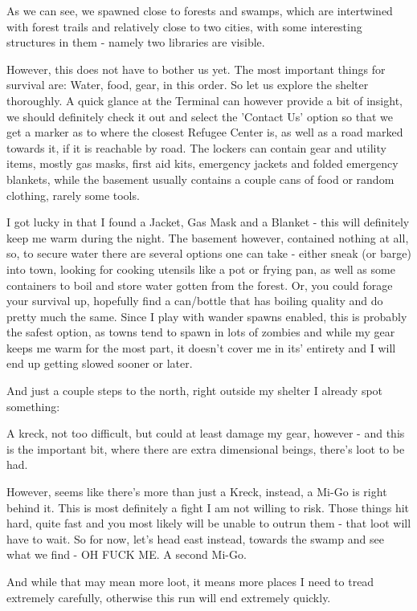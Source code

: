 \documentclass[11pt]{report}
\begin{document}
As we can see, we spawned close to forests and swamps, which are intertwined with forest trails and relatively close to two cities, with some interesting structures in them - namely two libraries are visible.

However, this does not have to bother us yet. The most important things for survival are:
Water,
food,
gear,
in this order. So let us explore the shelter thoroughly.
A quick glance at the Terminal can however provide a bit of insight, we should definitely check it out and select the 'Contact Us' option so that we get a marker as to where the closest Refugee Center is, as well as a road marked towards it, if it is reachable by road.
The lockers can contain gear and utility items, mostly gas masks, first aid kits, emergency jackets and folded emergency blankets, while the basement usually contains a couple cans of food or random clothing, rarely some tools.

I got lucky in that I found a Jacket, Gas Mask and a Blanket - this will definitely keep me warm during the night.
The basement however, contained nothing at all, so, to secure water there are several options one can take - either sneak (or barge) into town, looking for cooking utensils like a pot or frying pan, as well as some containers to boil and store water gotten from the forest. Or, you could forage your survival up, hopefully find a can/bottle that has boiling quality and do pretty much the same. Since I play with wander spawns enabled, this is probably the safest option, as towns tend to spawn in lots of zombies and while my gear keeps me warm for the most part, it doesn't cover me in its' entirety and I will end up getting slowed sooner or later.

And just a couple steps to the north, right outside my shelter I already spot something:

A kreck, not too difficult, but could at least damage my gear, however - and this is the important bit, where there are extra dimensional beings, there's loot to be had.

However, seems like there's more than just a Kreck, instead, a Mi-Go is right behind it. This is most definitely a fight I am not willing to risk. Those things hit hard, quite fast and you most likely will be unable to outrun them - that loot will have to wait.
So for now, let's head east instead, towards the swamp and see what we find - OH FUCK ME. A second Mi-Go.

And while that may mean more loot, it means more places I need to tread extremely carefully, otherwise this run will end extremely quickly.
\end{document}
